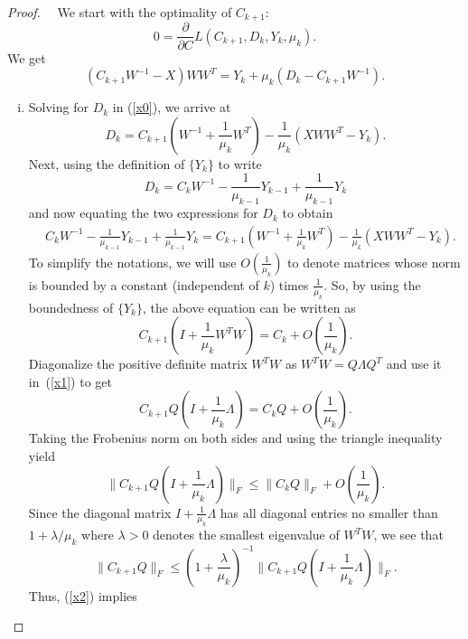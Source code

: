 \documentclass[twoside,11pt]{article}
\begin{document}
\begin{proof}~~We start with the optimality of $C_{k+1}$:
	\begin{equation*}0 = \frac{\partial}{\partial C} L(C_{k+1},D_{k},Y_k,\mu_k).\end{equation*}
	We get
	\begin{equation}\label{x0}
	(C_{k+1}W^{-1}-X)W W^{T} = Y_k+\mu_k (D_k-C_{k+1}W^{-1}).
	\end{equation}
\begin{enumerate}[(i)]
	\item Solving for $D_k$ in (\ref{x0}), we arrive at
	\begin{equation*}D_k=C_{k+1}(W^{-1}+\frac{1}{\mu_k} W^T)-\frac{1}{\mu_k}(XW W^T-Y_k).\end{equation*}
	Next, using the definition of $\{Y_k\}$ to write
	\begin{equation*}
	D_k=C_k W^{-1}-\frac{1}{\mu_{k-1}} Y_{k-1}+\frac{1}{\mu_{k-1}} Y_k
	\end{equation*}
	and now equating the two expressions for $D_k$ to obtain
	\begin{align*}
	& C_kW^{-1}-\frac{1}{\mu_{k-1}} Y_{k-1}+\frac{1}{\mu_{k-1}} Y_k
	=C_{k+1}(W^{-1}+\frac{1}{\mu_k} W^T)-\frac{1}{\mu_k}(XW W^T-Y_k).\end{align*}
	To simplify the notations, we will use $O(\frac{1}{\mu_k})$ to denote matrices whose norm is bounded by a constant (independent of $k$) times $\frac{1}{\mu_k}$. So, by using the boundedness of $\{Y_k\}$, the above equation can be written as
	\begin{equation}\label{x1}
	C_{k+1}(I+\frac{1}{\mu_k}W^TW)=C_k+O(\frac{1}{\mu_k}).
	\end{equation}
	Diagonalize the positive definite matrix $W^TW$ as $W^TW=Q\Lambda Q^T$ and use it in~(\ref{x1}) to get
	\begin{equation*}
	C_{k+1}Q(I+\frac{1}{\mu_k}\Lambda)=C_kQ+O(\frac{1}{\mu_k}).
	\end{equation*}
	Taking the Frobenius norm on both sides and using the triangle inequality yield
	\begin{equation}\label{x2}
	\|C_{k+1}Q(I+\frac{1}{\mu_k}\Lambda)\|_F\leq \|C_kQ\|_F+O(\frac{1}{\mu_k}).
	\end{equation}
	Since the diagonal matrix $I+\frac{1}{\mu_k}\Lambda$ has all diagonal entries no smaller than $1+\lambda/\mu_k$ where $\lambda>0$ denotes the smallest eigenvalue of $W^TW$, we see that
	\begin{equation*}\|C_{k+1}Q\|_F\leq (1+\frac{\lambda}{\mu_k})^{-1} \|C_{k+1}Q(I+\frac{1}{\mu_k}\Lambda)\|_F.\end{equation*} Thus,  (\ref{x2}) implies

\end{enumerate}
\end{proof}
\end{document}
